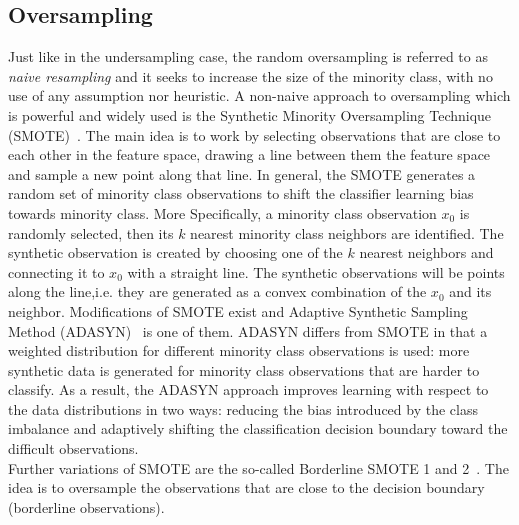 \subsection{Oversampling}

Just like in the undersampling case, the random oversampling is referred to as {\em naive resampling} and it seeks to increase the size of the minority class, with no use of any assumption nor heuristic.
A non-naive approach to oversampling which is powerful and widely used is the 
Synthetic Minority Oversampling Technique (SMOTE)~\cite{chawla2002smote}. The main idea is to work by selecting observations that are close to each other in the feature space, drawing a line between them the feature space and  sample a new point along that line. In general, the SMOTE generates a random set of minority class observations to shift the classifier learning bias towards minority class.
More Specifically,  a minority class observation $x_{0}$  is randomly selected, then its  $k$ nearest minority class neighbors are identified. The synthetic observation is  created by choosing one of the $k$ nearest neighbors and connecting it to $x_{0}$ with a straight line. The synthetic observations will be points along the line,i.e. they are generated as a convex combination of the $x_{0}$ and its neighbor.
Modifications of SMOTE exist and Adaptive Synthetic Sampling Method (ADASYN)~\cite{he2008adasyn} is one of them. ADASYN  differs from SMOTE in that a   weighted distribution for different minority class observations is used:  more synthetic data is generated for minority class observations that are harder to classify.
 As a result, the ADASYN approach improves learning with respect to the data distributions in two ways:  reducing the bias introduced by the class imbalance and  adaptively shifting the classification decision boundary toward the difficult observations. \\
 \noindent
 Further variations of SMOTE are the so-called Borderline SMOTE 1 and 2~\cite{han2005borderline}. The idea is to oversample the observations that are  close to the decision boundary (borderline observations).






